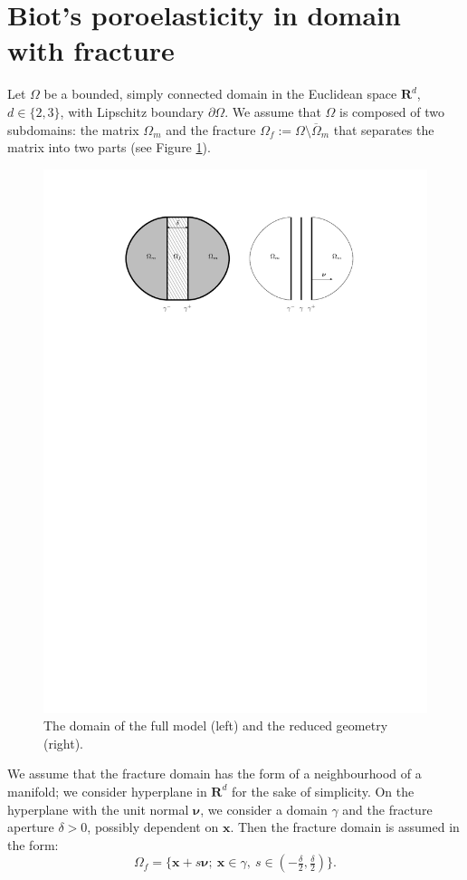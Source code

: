 \documentclass[a4paper]{article}
\numberwithin{equation}{section}
\def\nnu{\boldsymbol\nu}
\def\Real{{\mathbf R}} %
\def\vc#1{\mathbf{#1}}     %
\def\xx{\vc x}
\newcommand{\eqs}[1]{\begin{equation*}#1\end{equation*}}
\def\js#1{{\color{blue}#1}}
\begin{document}
\section{Biot's poroelasticity in domain with fracture}\label{sec:model}
Let $\Omega$ be a bounded, simply connected domain in the Euclidean space $\Real^d$, $d\in\{2,3\}$, with Lipschitz boundary $\partial\Omega$.
We assume that $\Omega$ is composed of two subdomains: the matrix $\Omega_m$ and the fracture $\Omega_f:=\Omega\setminus\overline\Omega_m$ that separates the matrix into two parts (see Figure \ref{fig:omegas}). 
\begin{figure}[h]
\centering
\includegraphics[width=\textwidth]{figures/omegas}
\caption{The domain of the full model (left) and the reduced geometry (right).}
\label{fig:omegas}
\end{figure}

We assume that the fracture domain \js{has} the form of a neighbourhood of a manifold; we consider hyperplane in $\Real^d$ for the sake of simplicity. On the hyperplane with \js{the unit} normal $\nnu$,  we consider a domain $\gamma$ and the fracture aperture $\delta > 0$, possibly dependent on $\vc x$. Then the fracture domain is assumed in the form:
\eqs{ \Omega_f = \{\xx+s\nnu;~\xx\in\gamma,~s\in(-\tfrac\delta2,\tfrac\delta2)\}. } 
\end{document}
